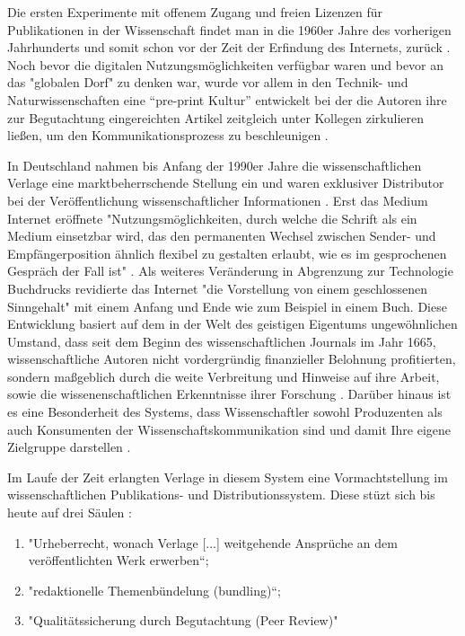 Die ersten Experimente mit offenem Zugang und freien Lizenzen für Publikationen in der Wissenschaft findet man in die 1960er Jahre des vorherigen Jahrhunderts und somit schon vor der Zeit der Erfindung des Internets, zurück \cite{cite:18b}. Noch bevor die digitalen Nutzungsmöglichkeiten verfügbar waren und bevor an das "globalen Dorf"\cite{mcluhan_1962_gutenberg} zu denken war, wurde vor allem in den Technik- und Naturwissenschaften eine “pre-print Kultur” entwickelt bei der die Autoren ihre zur Begutachtung eingereichten Artikel zeitgleich unter Kollegen zirkulieren ließen, um den Kommunikationsprozess zu beschleunigen \cite{suchen-Hoffmann-Zugang-undVerwertung-öffentlicher-Informationen}. 

In Deutschland nahmen bis Anfang der 1990er Jahre die wissenschaftlichen Verlage eine marktbeherrschende Stellung ein und waren exklusiver Distributor bei der Veröffentlichung wissenschaftlicher Informationen \cite{schloegl_2005} \cite{offhaus_2012_institutionelle_repos}. Erst das Medium Internet eröffnete "Nutzungsmöglichkeiten, durch welche die Schrift als ein Medium einsetzbar wird, das den permanenten Wechsel zwischen Sender- und Empfängerposition ähnlich flexibel zu gestalten erlaubt, wie es im gesprochenen Gespräch der Fall ist" \cite{sandbothe_2000_pragmatische}. Als weiteres Veränderung in Abgrenzung zur Technologie Buchdrucks revidierte das Internet "die Vorstellung von einem geschlossenen Sinngehalt" \cite{sandbothe_2000_pragmatische} mit einem Anfang und Ende wie zum Beispiel in einem Buch. Diese Entwicklung basiert auf dem in der Welt des geistigen Eigentums ungewöhnlichen Umstand, dass seit dem Beginn des wissenschaftlichen Journals im Jahr 1665, wissenschaftliche Autoren nicht vordergründig finanzieller Belohnung profitierten, sondern maßgeblich durch die weite Verbreitung und Hinweise auf ihre Arbeit, sowie die wissenenschaftlichen Erkenntnisse ihrer Forschung \cite{albert_2006_open_implications}. Darüber hinaus ist es eine Besonderheit des Systems, dass Wissenschaftler sowohl Produzenten als auch Konsumenten der Wissenschaftskommunikation sind und damit Ihre eigene Zielgruppe darstellen \cite{Hess_2006}.

Im Laufe der Zeit erlangten Verlage in diesem System eine Vormachtstellung im wissenschaftlichen Publikations- und Distributionssystem. Diese stüzt sich bis heute auf drei Säulen \cite{offhaus_2012_institutionelle_repos} \cite{bargheer_2006_open}: 
\begin{enumerate}
\item "Urheberrecht, wonach Verlage [...] weitgehende Ansprüche an dem veröffentlichten Werk erwerben“;
\item "redaktionelle Themenbündelung (bundling)“;
\item "Qualitätssicherung durch Begutachtung (Peer Review)"
\end{enumerate}

